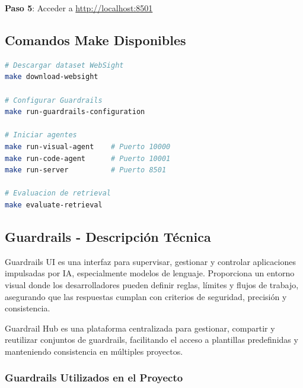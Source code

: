 \documentclass[12pt,a4paper]{article}
\begin{document}
\textbf{Paso 5}: Acceder a \url{http://localhost:8501}

\subsection{Comandos Make Disponibles}

\begin{lstlisting}[language=bash]
# Descargar dataset WebSight
make download-websight

# Configurar Guardrails
make run-guardrails-configuration

# Iniciar agentes
make run-visual-agent    # Puerto 10000
make run-code-agent      # Puerto 10001
make run-server          # Puerto 8501

# Evaluacion de retrieval
make evaluate-retrieval
\end{lstlisting}

\subsection{Guardrails - Descripción Técnica}

Guardrails UI es una interfaz para supervisar, gestionar y controlar aplicaciones impulsadas por IA, especialmente modelos de lenguaje. Proporciona un entorno visual donde los desarrolladores pueden definir reglas, límites y flujos de trabajo, asegurando que las respuestas cumplan con criterios de seguridad, precisión y consistencia.

Guardrail Hub es una plataforma centralizada para gestionar, compartir y reutilizar conjuntos de guardrails, facilitando el acceso a plantillas predefinidas y manteniendo consistencia en múltiples proyectos.

\subsubsection{Guardrails Utilizados en el Proyecto}
\end{document}
